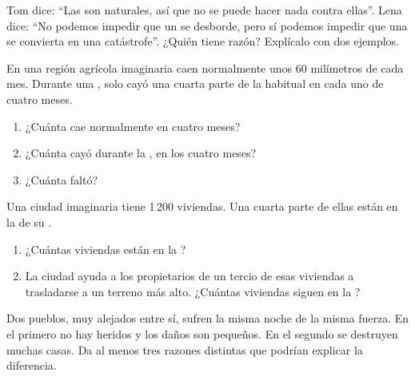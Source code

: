 \begin{exercise}[$\star\star$]\label{exo:g5:natural-hazards:8}
Tom dice: ``Las  son naturales, así que no se puede hacer nada
contra ellas''. Lena dice: ``No podemos impedir que un  se desborde, pero
sí podemos impedir que una  se convierta en una catástrofe''.
¿Quién tiene razón? Explícalo con dos ejemplos.
\end{exercise}

\begin{exercise}[$\star\star$]\label{exo:g5:natural-hazards:9}
En una región agrícola imaginaria caen normalmente unos 60 milímetros de
 cada mes. Durante una , solo cayó una cuarta parte de la 
habitual en cada uno de cuatro meses.
\begin{enumerate}
  \item[(a)] ¿Cuánta  cae normalmente en cuatro meses?
  \item[(b)] ¿Cuánta cayó durante la , en los cuatro meses?
  \item[(c)] ¿Cuánta  faltó?
\end{enumerate}
\end{exercise}

\begin{exercise}[$\star\star$]\label{exo:g5:natural-hazards:10}
Una ciudad imaginaria tiene 1\,200 viviendas. Una cuarta parte de ellas
están en la  de su .
\begin{enumerate}
  \item[(a)] ¿Cuántas viviendas están en la ?
  \item[(b)] La ciudad ayuda a los propietarios de un tercio de esas
        viviendas a trasladarse a un terreno más alto. ¿Cuántas viviendas
        siguen en la ?
\end{enumerate}
\end{exercise}

\begin{exercise}[$\star\star\star$]\label{exo:g5:natural-hazards:11}
Dos pueblos, muy alejados entre sí, sufren la misma noche  de la
misma fuerza. En el primero no hay heridos y los daños son pequeños. En el
segundo se destruyen muchas casas. Da al menos tres razones distintas que
podrían explicar la diferencia.
\end{exercise}
